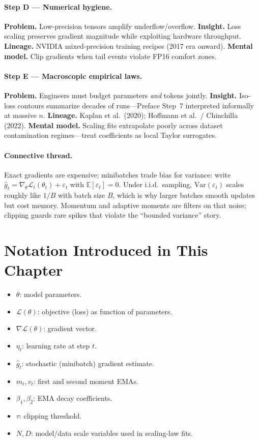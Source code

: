 \paragraph{Step D --- Numerical hygiene.}
\textbf{Problem.} Low-precision tensors amplify underflow/overflow.
\textbf{Insight.} Loss scaling preserves gradient magnitude while exploiting hardware throughput.
\textbf{Lineage.} NVIDIA mixed-precision training recipes (2017 era onward).
\textbf{Mental model.} Clip gradients when tail events violate FP16 comfort zones.

\paragraph{Step E --- Macroscopic empirical laws.}
\textbf{Problem.} Engineers must budget parameters \emph{and} tokens jointly.
\textbf{Insight.} Iso-loss contours summarize decades of runs---Preface Step~7 interpreted informally at massive $n$.
\textbf{Lineage.} Kaplan et al.\ (2020); Hoffmann et al.\ / Chinchilla (2022).
\textbf{Mental model.} Scaling fits extrapolate poorly across dataset contamination regimes---treat coefficients as local Taylor surrogates.

\paragraph{Connective thread.}
Exact gradients are expensive; minibatches trade bias for variance: write $\hat g_t=\nabla_\theta \mathcal{L}_t(\theta_t)+\varepsilon_t$ with $\mathbb{E}[\varepsilon_t]=0$. Under i.i.d.\ sampling, $\mathrm{Var}(\varepsilon_t)$ scales roughly like $1/B$ with batch size $B$, which is why larger batches smooth updates but cost memory. Momentum and adaptive moments are filters on that noise; clipping guards rare spikes that violate the ``bounded variance'' story.

\section*{Notation Introduced in This Chapter}
\begin{itemize}[leftmargin=1.5em]
  \item $\theta$: model parameters.
  \item $\mathcal{L}(\theta)$: objective (loss) as function of parameters.
  \item $\nabla\mathcal{L}(\theta)$: gradient vector.
  \item $\eta_t$: learning rate at step $t$.
  \item $\hat g_t$: stochastic (minibatch) gradient estimate.
  \item $m_t, v_t$: first and second moment EMAs.
  \item $\beta_1,\beta_2$: EMA decay coefficients.
  \item $\tau$: clipping threshold.
  \item $N,D$: model/data scale variables used in scaling-law fits.
\end{itemize}

